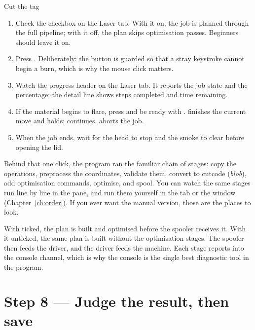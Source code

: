 \begin{walkthrough}{Cut the tag}
\begin{enumerate}[label=\arabic*.,leftmargin=1.4em]
  \item Check the  checkbox on the Laser tab. With it on, the job
        is planned through the full pipeline; with it off, the plan skips
        optimisation passes. Beginners should leave it on.
  \item Press . Deliberately: the button is guarded so that a stray
        keystroke cannot begin a burn, which is why the mouse click matters.
  \item Watch the progress header on the Laser tab. It reports the job state and
        the percentage; the detail line shows steps completed and time remaining.
  \item If the material begins to flare, press  and be ready with
        .  finishes the current move and holds;
         continues.  aborts the job.
  \item When the job ends, wait for the head to stop and the smoke to clear
        before opening the lid.
\end{enumerate}
\end{walkthrough}

\noindent Behind that one click, the program ran the familiar chain of stages:
copy the operations, preprocess the coordinates, validate them, convert to
cutcode (\emph{blob}), add optimisation commands, optimise, and spool. You can
watch the same stages run line by line in the  pane, and run them
yourself in the  tab or the  window
(Chapter~\ref{ch:order}). If you ever want the manual version, those are the
places to look.

\begin{behindbox}
With  ticked, the plan is built and optimised before the spooler
receives it. With it unticked, the same plan is built without the optimisation
stages. The spooler then feeds the driver, and the driver feeds the machine. Each
stage reports into the console channel, which is why the console is the single
best diagnostic tool in the program.
\end{behindbox}

\section{Step 8 --- Judge the result, then save}

